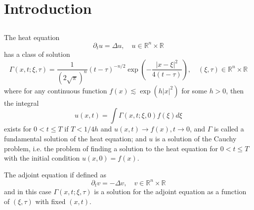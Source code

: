 \newcommand{\expo}[1]{\exp\left({#1}\right)}

\section{Introduction}

\subsection{}

\begin{definition}
    The heat equation
    \[
    \partial_t u = \Delta u,\quad u\in \mathbb{R}^n\times\mathbb{R}
    \]
    has a class of solution
    \[
    \Gamma(x,t;\xi,\tau) = \dfrac{1}{(2\sqrt{\pi})^n}(t-\tau)^{-n/2}\exp\left(-\dfrac{|x-\xi|^2}{4(t-\tau)}\right),\quad (\xi,\tau) \in \mathbb{R}^n\times\mathbb{R}
    \]
    where for any continuous function $f(x) \lesssim \expo{h|x|^2}$ for some $h>0$, then the integral
    \[u(x,t) = \int \Gamma(x,t;\xi,0)f(\xi)d\xi\]
    exists for $0<t\leq T$ if $T<1/4h$ and $u(x,t) \to f(x), t\to 0$, and $\Gamma$ is called a fundamental solution of the heat equation; and $u$ is a solution of the Cauchy problem, i.e. the problem of finding a solution to the heat equation for $0<t \leq T$ with the initial condition $u(x,0) = f(x)$.\par
    The adjoint equation if defined as
    \[
    \partial_t v = - \Delta v,\quad v\in \mathbb{R}^n\times\mathbb{R}
    \]
    and in this case $\Gamma(x,t;\xi,\tau)$ is a solution for the adjoint equation as a function of $(\xi,\tau)$ with fixed $(x,t)$.
\end{definition}


